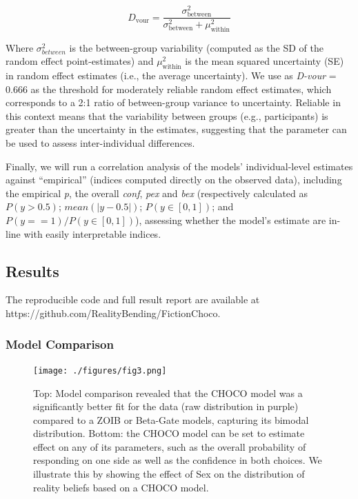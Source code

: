 \documentclass[
  jou,
  floatsintext,
  longtable,
  nolmodern,
  notxfonts,
  notimes,
  colorlinks=true,linkcolor=blue,citecolor=blue,urlcolor=blue]{apa7}
\begin{document}
\[
D_{\text{vour}} = \frac{\sigma_{\text{between}}^2}{\sigma_{\text{between}}^2 + \mu_{\text{within}}^2}
\]

Where \(\sigma_{between}^2\) is the between-group variability (computed
as the SD of the random effect point-estimates) and
\(\mu_{\text{within}}^2\) is the mean squared uncertainty (SE) in random
effect estimates (i.e., the average uncertainty). We use as
\emph{D-vour} = 0.666 as the threshold for moderately reliable random
effect estimates, which corresponds to a 2:1 ratio of between-group
variance to uncertainty. Reliable in this context means that the
variability between groups (e.g., participants) is greater than the
uncertainty in the estimates, suggesting that the parameter can be used
to assess inter-individual differences.

Finally, we will run a correlation analysis of the models'
individual-level estimates against ``empirical'' (indices computed
directly on the observed data), including the empirical \emph{p}, the
overall \emph{conf}, \emph{pex} and \emph{bex} (respectively calculated
as \(P(y > 0.5)\); \(mean(|y - 0.5|)\); \(P(y \in [0, 1])\); and
\(P(y == 1) / P(y \in [0, 1])\)), assessing whether the model's estimate
are in-line with easily interpretable indices.

\subsection{Results}\label{results}

The reproducible code and full result report are available at
https://github.com/RealityBending/FictionChoco.

\subsubsection{Model Comparison}\label{model-comparison}

\begin{figure}[!htbp]

{\caption{{Top: Model comparison revealed that the CHOCO model was a
significantly better fit for the data (raw distribution in purple)
compared to a ZOIB or Beta-Gate models, capturing its bimodal
distribution. Bottom: the CHOCO model can be set to estimate effect on
any of its parameters, such as the overall probability of responding on
one side as well as the confidence in both choices. We illustrate this
by showing the effect of Sex on the distribution of reality beliefs
based on a CHOCO model.}{\label{fig-three}}}}

\begin{center}
\texttt{[image: ./figures/fig3.png]}
\end{center}

\end{figure}
\end{document}
